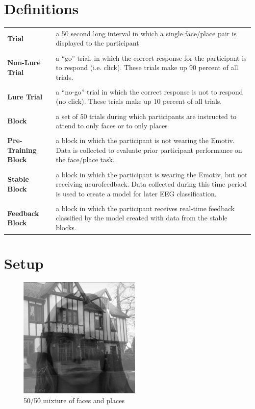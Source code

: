 \documentclass[12pt]{report}
\begin{document}
\section{Definitions}
\begin{table}[h]
\begin{tabular}{p{4cm}|p{10cm}}
\textbf{Trial}  & a 50 second long interval in which a single face/place pair is displayed to the participant  \\
\\
\textbf{Non-Lure Trial} & a “go” trial, in which the correct response for the participant is to respond (i.e. click).  These trials make up 90 percent of all trials.\\
\\
\textbf{Lure Trial}  & a “no-go” trial in which the correct response is not to respond (no click).  These trials make up 10 percent of all trials.\\
\\
\textbf{Block} & a set of 50 trials during which participants are instructed to attend to only faces or to only places\\
\\
\textbf{Pre-Training Block}  & a block in which the participant is not wearing the Emotiv.  Data is collected to evaluate prior participant performance on the face/place task. \\
\\
\textbf{Stable Block} & a block in which the participant is wearing the Emotiv, but not receiving neurofeedback.  Data collected during this time period is used to create a model for later EEG classification.\\
\\
\textbf{Feedback Block} & a block in which the participant receives real-time feedback classified by the model created with data from the stable blocks.
\end{tabular}
\end{table}

\section{Setup}
	\begin{figure}
	
	\includegraphics[width=6cm]{faceplace}	
	\centering
	\caption{50/50 mixture of faces and places}
	\end{figure}
	
\end{document}
